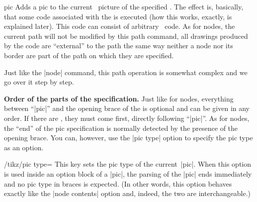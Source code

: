 \begin{pathoperation}{pic}{
}
    Adds a pic to the current \tikzname\ picture of the specified . The effect is, basically, that some code associated with the
     is executed (how this works, exactly, is explained later).
    This code can consist of arbitrary \tikzname\ code. As for nodes, the
    current path will not be modified by this path command, all drawings
    produced by the code are ``external'' to the path the same way neither a
    node nor its border are part of the path on which they are specified.

    Just like the |node| command, this path operation is somewhat complex and
    we go over it step by step.

    \medskip
    \textbf{Order of the parts of the specification.}
    Just like for nodes, everything between ``|pic|'' and the opening brace of
    the  is optional and can be given in any order. If there are
    , they must come first, directly following
    ``|pic|''. As for nodes, the ``end'' of the pic specification is normally
    detected by the presence of the opening brace. You can, however, use the
    |pic type| option to specify the pic type as an option.

    \begin{key}{/tikz/pic type=}
        This key sets the pic type of the current~|pic|. When this option is
        used inside an option block of a |pic|, the parsing of the |pic| ends
        immediately and no pic type in braces is expected. (In other words,
        this option behaves exactly like the |node contents| option and,
        indeed, the two are interchangeable.)
\begin{codeexample}[
    pre={\tikzset{
  seagull/.pic={
    \draw (-3mm,0) to [bend left] (0,0) to [bend left] (3mm,0);
  },
}}]
\end{codeexample}
    \end{key}


\end{pathoperation}
